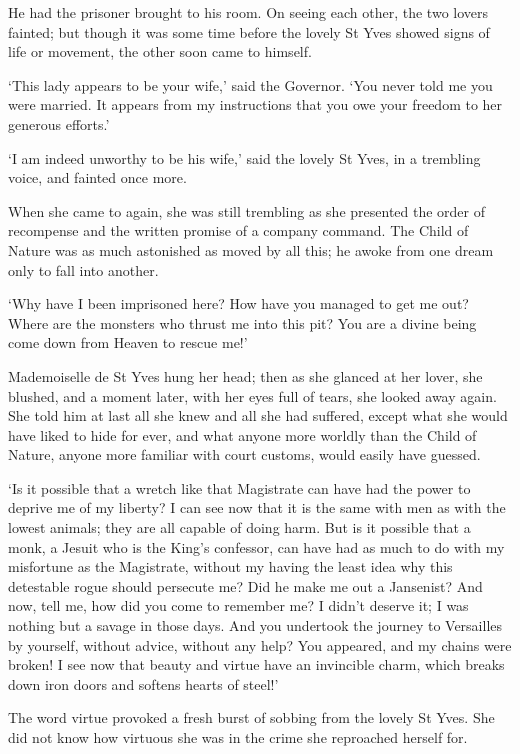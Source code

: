 \documentclass{article}
\begin{document}
\begin{center}
He had the prisoner brought to his room. On seeing each other, the two lovers fainted; 
but though it was some time before the lovely St Yves showed signs of life or movement, 
the other soon came to himself. 

`This lady appears to be your wife,' said the Governor. `You never told me you 
were married. It appears from my instructions that you owe your freedom to her 
generous efforts.' 

`I am indeed unworthy to be his wife,' said the lovely St Yves, in a trembling 
voice, and fainted once more. 

When she came to again, she was still trembling as she presented the order of recompense 
and the written promise of a company command. The Child of Nature was as much astonished 
as moved by all this; he awoke from one dream only to fall into another. 

`Why have I been imprisoned here? How have you managed to get me out? Where are 
the monsters who thrust me into this pit? You are a divine being come down from 
Heaven to rescue me!' 

Mademoiselle de St Yves hung her head; then as she glanced at her lover, she blushed, 
and a moment later, with her eyes full of tears, she looked away again. She told 
him at last all she knew and all she had suffered, except what she would have liked 
to hide for ever, and what anyone more worldly than the Child of Nature, anyone 
more familiar with court customs, would easily have guessed. 

`Is it possible that a wretch like that Magistrate can have had the power to deprive 
me of my liberty? I can see now that it is the same with men as with the lowest 
animals; they are all capable of doing harm. But is it possible that a monk, a 
Jesuit who is the King's confessor, can have had as much to do with my misfortune 
as the Magistrate, without my having the least idea why this detestable rogue should 
persecute me? Did he make me out a Jansenist? And now, tell me, how did you come 
to remember me? I didn't deserve it; I was nothing but a savage in those days. 
And you undertook the journey to Versailles by yourself, without advice, without 
any help? You appeared, and my chains were broken! I see now that beauty and virtue 
have an invincible charm, which breaks down iron doors and softens hearts of steel!' 

The word virtue provoked a fresh burst of sobbing from the lovely St Yves. She 
did not know how virtuous she was in the crime she reproached herself for. 


\end{center}
\end{document}
